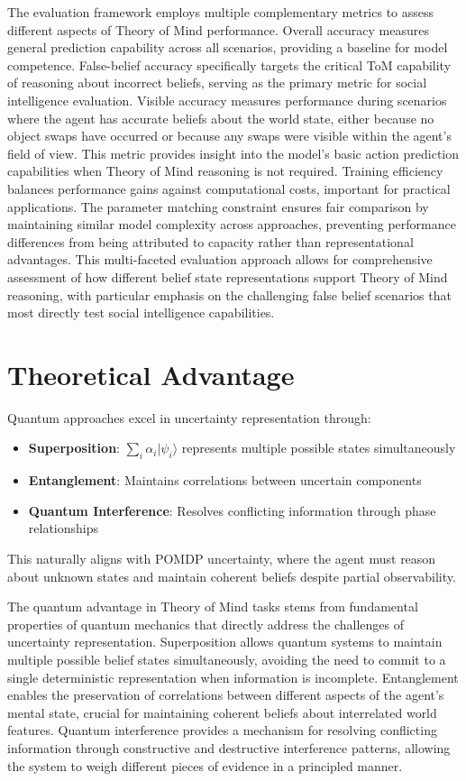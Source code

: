 \documentclass[11pt]{article}
\begin{document}
The evaluation framework employs multiple complementary metrics to assess different aspects of Theory of Mind performance. Overall accuracy measures general prediction capability across all scenarios, providing a baseline for model competence. False-belief accuracy specifically targets the critical ToM capability of reasoning about incorrect beliefs, serving as the primary metric for social intelligence evaluation. Visible accuracy measures performance during scenarios where the agent has accurate beliefs about the world state, either because no object swaps have occurred or because any swaps were visible within the agent's field of view. This metric provides insight into the model's basic action prediction capabilities when Theory of Mind reasoning is not required. Training efficiency balances performance gains against computational costs, important for practical applications. The parameter matching constraint ensures fair comparison by maintaining similar model complexity across approaches, preventing performance differences from being attributed to capacity rather than representational advantages. This multi-faceted evaluation approach allows for comprehensive assessment of how different belief state representations support Theory of Mind reasoning, with particular emphasis on the challenging false belief scenarios that most directly test social intelligence capabilities.

\section{Theoretical Advantage}

Quantum approaches excel in uncertainty representation through:
\begin{itemize}
    \item \textbf{Superposition}: $\sum_i \alpha_i |\psi_i\rangle$ represents multiple possible states simultaneously
    \item \textbf{Entanglement}: Maintains correlations between uncertain components
    \item \textbf{Quantum Interference}: Resolves conflicting information through phase relationships
\end{itemize}

This naturally aligns with POMDP uncertainty, where the agent must reason about unknown states and maintain coherent beliefs despite partial observability.

The quantum advantage in Theory of Mind tasks stems from fundamental properties of quantum mechanics that directly address the challenges of uncertainty representation. Superposition allows quantum systems to maintain multiple possible belief states simultaneously, avoiding the need to commit to a single deterministic representation when information is incomplete. Entanglement enables the preservation of correlations between different aspects of the agent's mental state, crucial for maintaining coherent beliefs about interrelated world features. Quantum interference provides a mechanism for resolving conflicting information through constructive and destructive interference patterns, allowing the system to weigh different pieces of evidence in a principled manner.
\end{document}
